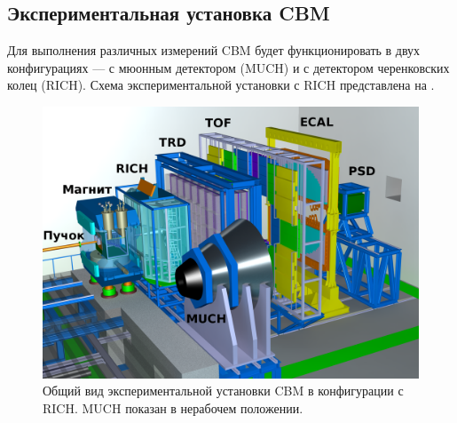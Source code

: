 
\subsection{Экспериментальная установка CBM}\label{sec:secCbmSetup}



Для выполнения различных измерений CBM будет функционировать в двух конфигурациях --- с мюонным детектором (MUCH) и с детектором черенковских колец (RICH). Схема экспериментальной установки с RICH представлена на .

\begin{figure}[H]
\centering
\includegraphics[width=1.0\textwidth]{pictures/1_CBM_SIS100_with_names.png}
\caption{Общий вид экспериментальной установки CBM в конфигурации с RICH. MUCH показан в нерабочем положении.}
\label{fig:CBM}
\end{figure}

